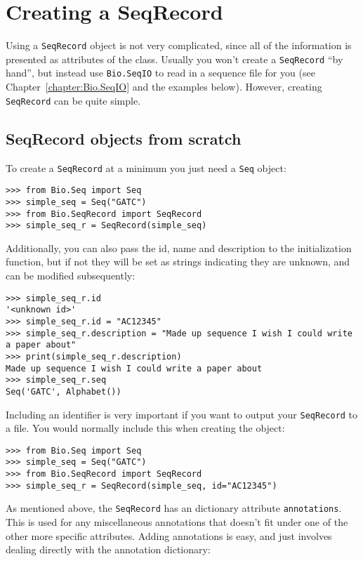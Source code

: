 \documentclass{report}
\begin{document}
\section{Creating a SeqRecord}

Using a \verb|SeqRecord| object is not very complicated, since all of the
information is presented as attributes of the class. Usually you won't create
a \verb|SeqRecord| ``by hand'', but instead use \verb|Bio.SeqIO| to read in a
sequence file for you (see Chapter~\ref{chapter:Bio.SeqIO} and the examples
below).  However, creating \verb|SeqRecord| can be quite simple.

\subsection{SeqRecord objects from scratch}

To create a \verb|SeqRecord| at a minimum you just need a \verb|Seq| object:

\begin{verbatim}
>>> from Bio.Seq import Seq
>>> simple_seq = Seq("GATC")
>>> from Bio.SeqRecord import SeqRecord
>>> simple_seq_r = SeqRecord(simple_seq)
\end{verbatim}

Additionally, you can also pass the id, name and description to the initialization function, but if not they will be set as strings indicating they are unknown, and can be modified subsequently:

\begin{verbatim}
>>> simple_seq_r.id
'<unknown id>'
>>> simple_seq_r.id = "AC12345"
>>> simple_seq_r.description = "Made up sequence I wish I could write a paper about"
>>> print(simple_seq_r.description)
Made up sequence I wish I could write a paper about
>>> simple_seq_r.seq
Seq('GATC', Alphabet())
\end{verbatim}

Including an identifier is very important if you want to output your \verb|SeqRecord| to a file.  You would normally include this when creating the object:

\begin{verbatim}
>>> from Bio.Seq import Seq
>>> simple_seq = Seq("GATC")
>>> from Bio.SeqRecord import SeqRecord
>>> simple_seq_r = SeqRecord(simple_seq, id="AC12345")
\end{verbatim}

As mentioned above, the \verb|SeqRecord| has an dictionary attribute \verb|annotations|. This is used
for any miscellaneous annotations that doesn't fit under one of the other more specific attributes.
Adding annotations is easy, and just involves dealing directly with the annotation dictionary:
\end{document}
